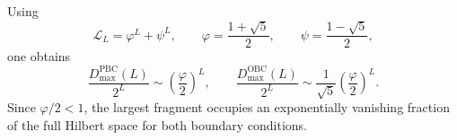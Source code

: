 \documentclass[aps,prb,reprint,twocolumn,amsmath,amssymb,citeautoscript]{revtex4-2}
\begin{document}
Using
\begin{equation}
\mathcal L_L=\varphi^L+\psi^L,
\qquad
\varphi=\frac{1+\sqrt5}{2},
\qquad
\psi=\frac{1-\sqrt5}{2},
\label{eq:app:lucasclosed}
\end{equation}
one obtains
\begin{equation}
\frac{D_{\max}^{\mathrm{PBC}}(L)}{2^L}
\sim
\left(\frac{\varphi}{2}\right)^L,
\qquad
\frac{D_{\max}^{\mathrm{OBC}}(L)}{2^L}
\sim
\frac{1}{\sqrt5}\left(\frac{\varphi}{2}\right)^L.
\label{eq:app:strongfrag}
\end{equation}
Since \(\varphi/2<1\), the largest fragment occupies an exponentially vanishing fraction of the full Hilbert space for both boundary conditions.

\end{document}
